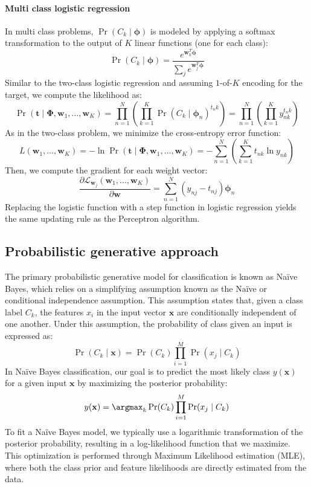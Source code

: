\paragraph*{Multi class logistic regression}
In multi class problems, $\Pr(C_k\mid\boldsymbol{\phi})$ is modeled by applying a softmax transformation to the output of $K$ linear functions (one for each class):
\[\Pr(C_k\mid\boldsymbol{\phi})=\dfrac{e^{\textbf{w}_k^T\boldsymbol{\phi}}}{\sum_j e^{\textbf{w}_j^T\boldsymbol{\phi}}}\]
Similar to the two-class logistic regression and assuming $1$-of-$K$  encoding for the target, we compute the likelihood as:
\[\Pr(\textbf{t}\mid\boldsymbol{\Phi},\textbf{w}_1,\dots,\textbf{w}_K)=\prod_{n=1}^N \left( \prod_{k=1}^K \Pr{(C_k\mid\boldsymbol{\phi}_n)}^{t_n k} \right)=\prod_{n=1}^N \left( \prod_{k=1}^K y^{t_n k}_{nk} \right)\]
As in the two-class problem, we minimize the cross-entropy error function:
\[L(\textbf{w}_1,\dots,\textbf{w}_K)=-\ln \Pr(\textbf{t}\mid\boldsymbol{\Phi},\textbf{w}_1,\dots,\textbf{w}_K)=-\sum_{n=1}^N \left(\sum_{k=1}^K t_{nk}\ln y_{nk} \right)\]
Then, we compute the gradient for each weight vector:
\[\dfrac{\partial\mathcal{L}_{\textbf{w}_j}(\textbf{w}_1,\dots,\textbf{w}_K)}{\partial\mathbf{w}} =\sum_{n=1}^N\left( y_{nj}-t_{nj} \right) \boldsymbol{\phi}_n\]
Replacing the logistic function with a step function in logistic regression yields the same updating rule as the Perceptron algorithm.

\subsection{Probabilistic generative approach}
The primary probabilistic generative model for classification is known as Naïve Bayes, which relies on a simplifying assumption known as the Naïve or conditional independence assumption. 
This assumption states that, given a class label $C_k$, the features $x_i$ in the input vector $\mathbf{x}$ are conditionally independent of one another.
Under this assumption, the probability of class given an input is expressed as: 
\[\Pr(C_k\mid\mathbf{x})=\Pr(C_k)\prod_{i=1}^M\Pr(x_j\mid C_k)\]
In Naïve Bayes classification, our goal is to predict the most likely class $y(\mathbf{x})$ for a given input $\mathbf{x}$ by maximizing the posterior probability:
\[y(\mathbf{x})=\argmax_k\Pr(C_k)\prod_{i=1}^M\Pr(x_j\mid C_k)\]
To fit a Naïve Bayes model, we typically use a logarithmic transformation of the posterior probability, resulting in a log-likelihood function that we maximize. 
This optimization is performed through Maximum Likelihood estimation (MLE), where both the class prior and feature likelihoods are directly estimated from the data.

